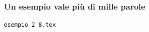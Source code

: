 \documentclass[svgnames,%
	ucs,%
	pdftex]{guitbeamer}
\begin{document}
\begin{frame}
  \frametitle{Un esempio vale pi\`u di mille parole}
	\begin{center}
		\alert{\texttt{esempio\_2\_8.tex}}
	\end{center}
\end{frame}
\end{document}
